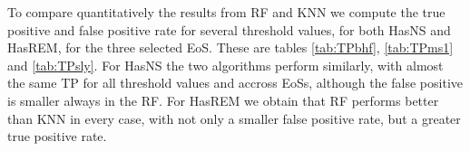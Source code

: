 




To compare quantitatively the results from RF and KNN we compute the true positive and false positive rate for several threshold values, for both HasNS and HasREM, for the three selected EoS. These are tables \ref{tab:TPbhf}, \ref{tab:TPms1} and \ref{tab:TPsly}. For HasNS the two algorithms perform similarly, with almost the same TP for all threshold values and accross EoSs, although the false positive is smaller always in the RF. For HasREM we obtain that RF performs better than KNN in every case, with not only a smaller false positive rate, but a greater true positive rate.


